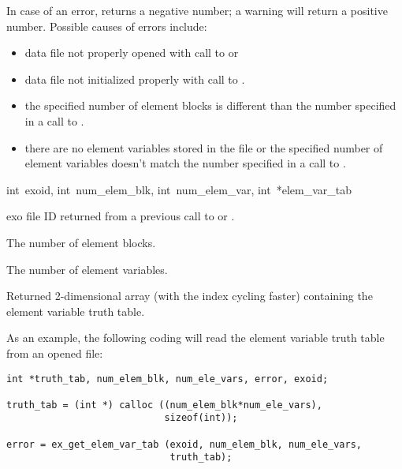 In case of an error,  returns a
negative number; a warning will return a positive number.  Possible
causes of errors include:

\begin{itemize}
 \item data file not properly opened with call to 
 or 

 \item data file not initialized properly with call to
 .

 \item the specified number of element blocks is different than the
 number specified in a call to .

 \item there are no element variables stored in the file or the
 specified number of element variables doesn't match the number
 specified in a call to .
\end{itemize}


{int~exoid, 
int~num_elem_blk, 
int~num_elem_var,
int~*elem_var_tab}

\begin{parameters}
\item[{int exoid \R{}}]
exo{} file ID returned from a previous call to  or
.

\item[{int num_elem_blk \R{}}]
The number of element blocks.

\item[{int num_elem_var \R{}}]
The number of element variables.

\item[{int elem_var_tab[num_elem_blk,num_elem_var}{]} {\W{}}]
Returned 2-dimensional array (with the  index cycling
faster) containing the element variable truth table.
\end{parameters}

As an example, the following coding will read the element 
variable truth table from an opened \exo{} file:

\begin{lstlisting}
int *truth_tab, num_elem_blk, num_ele_vars, error, exoid;

truth_tab = (int *) calloc ((num_elem_blk*num_ele_vars), 
                            sizeof(int));

error = ex_get_elem_var_tab (exoid, num_elem_blk, num_ele_vars, 
                             truth_tab);
\end{lstlisting}


